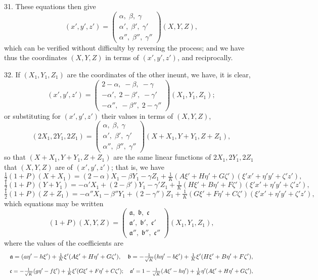 \documentclass[11pt]{article}
\begin{document}
\textsc{31.} These equations then give
\[ (x',y',z')=\begin{pmatrix}\alpha,\;\beta,\;\gamma\\ \alpha',\;\beta',\;\gamma'\\ \alpha'',\;\beta'',\;\gamma''\end{pmatrix}(X,Y,Z), \]
which can be verified without difficulty by reversing the process; and we have thus
the coordinates $(X,Y,Z)$ in terms of $(x',y',z')$, and reciprocally.

\textsc{32.} If $(X_{1},Y_{1},Z_{1})$ are the coordinates of the other ineunt, we have, it is clear,
\[ (x',y',z')=\begin{pmatrix}2-\alpha,\;-\beta,\;-\gamma\\ -\alpha',\;2-\beta',\;-\gamma'\\ -\alpha'',\;-\beta'',\;2-\gamma''\end{pmatrix}(X_{1},Y_{1},Z_{1}); \]
or substituting for $(x',y',z')$ their values in terms of $(X,Y,Z)$,
\[ (2X_{1},2Y_{1},2Z_{1})=\begin{pmatrix}\alpha,\;\beta,\;\gamma\\ \alpha',\;\beta',\;\gamma'\\ \alpha'',\;\beta'',\;\gamma''\end{pmatrix}(X+X_{1},Y+Y_{1},Z+Z_{1}), \]
so that $(X+X_{1},Y+Y_{1},Z+Z_{1})$ are the same linear functions of $2X_{1},2Y_{1},2Z_{1}$ that
$(X,Y,Z)$ are of $(x',y',z')$; that is, we have
\[ \tfrac{1}{2}(1+P)(X+X_{1})=(2-\alpha)X_{1}-\beta Y_{1}-\gamma Z_{1}+\tfrac{1}{K}(A\xi'+H\eta'+G\zeta')(\xi' x'+\eta' y'+\zeta' z'), \]
\[ \tfrac{1}{2}(1+P)(Y+Y_{1})=-\alpha' X_{1}+(2-\beta')Y_{1}-\gamma' Z_{1}+\tfrac{1}{K}(H\xi'+B\eta'+F\zeta')(\xi' x'+\eta' y'+\zeta' z'), \]
\[ \tfrac{1}{2}(1+P)(Z+Z_{1})=-\alpha'' X_{1}-\beta'' Y_{1}+(2-\gamma'')Z_{1}+\tfrac{1}{K}(G\xi'+F\eta'+C\zeta')(\xi' x'+\eta' y'+\zeta' z'), \]
which equations may be written
\[ (1+P)(X,Y,Z)=\begin{pmatrix}\mathfrak{a},\;\mathfrak{b},\;\mathfrak{c}\\ \mathfrak{a}',\;\mathfrak{b}',\;\mathfrak{c}'\\ \mathfrak{a}'',\;\mathfrak{b}'',\;\mathfrak{c}''\end{pmatrix}(X_{1},Y_{1},Z_{1}), \]
where the values of the coefficients are
\[ \resizebox{\textwidth}{!}{$\displaystyle
\mathfrak{a}=(a\eta'-h\xi')+\tfrac{1}{K}\xi'(A\xi'+H\eta'+G\zeta'),\quad
\mathfrak{b}=-\tfrac{1}{\sqrt{K}}(h\eta'-b\xi')+\tfrac{1}{K}\xi'(H\xi'+B\eta'+F\zeta'),$} \]
\[ \resizebox{\textwidth}{!}{$\displaystyle
\mathfrak{c}=-\tfrac{1}{\sqrt{K}}(g\eta'-f\xi')+\tfrac{1}{K}\xi'(G\xi'+F\eta'+C\zeta');\quad
\mathfrak{a}'=1-\tfrac{1}{\sqrt{K}}(A\xi'-h\eta')+\tfrac{1}{K}\eta'(A\xi'+H\eta'+G\zeta'),$} \]
\end{document}
